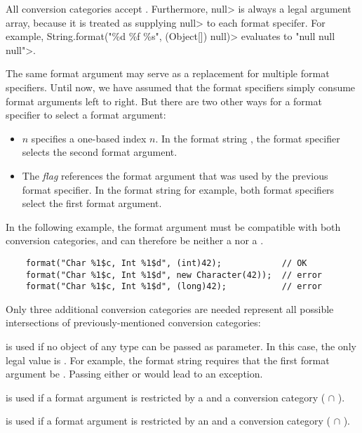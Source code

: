 \noindent All conversion categories accept .
Furthermore, \<null> is always a legal argument array, because it is treated
as supplying \<null> to each format specifer.  For example,
\<String.format("\%d \%f \%s", (Object[]) null)> evaluates to \<"null null null">.

The same format argument may serve as a replacement for multiple format specifiers.
Until now, we have assumed that the format specifiers simply consume format arguments left to right.
But there are two other ways for a format specifier to select a format argument:

\begin{itemize}
\item $n$\code{\$} specifies a one-based index $n$. In the
    format string , the format specifier selects the
    second format argument.
\item The \code{<} \emph{flag} references the format argument
    that was used by the previous format specifier. In the format string
     for example, both format specifiers select the first
    format argument.
\end{itemize}

\noindent
In the following example,
the format argument must be compatible with both conversion
categories, and can therefore be neither a  nor a .

\begin{Verbatim}
    format("Char %1$c, Int %1$d", (int)42);            // OK
    format("Char %1$c, Int %1$d", new Character(42));  // error
    format("Char %1$c, Int %1$d", (long)42);           // error
\end{Verbatim}

Only three additional conversion categories are needed represent all possible
intersections of previously-mentioned conversion categories:

\begin{description}
\item{} is used if no object of any type can be
    passed as parameter. In this case, the only legal value is .
    For example, the format string  requires that the first
    format argument be .  Passing either  or
     would lead to an exception.
\item{} is used if a format argument is restricted by a  and a  conversion category ( $\cap$ ).
\item{} is used if a format argument is restricted by an  and a  conversion category ( $\cap$ ).
\end{description}

